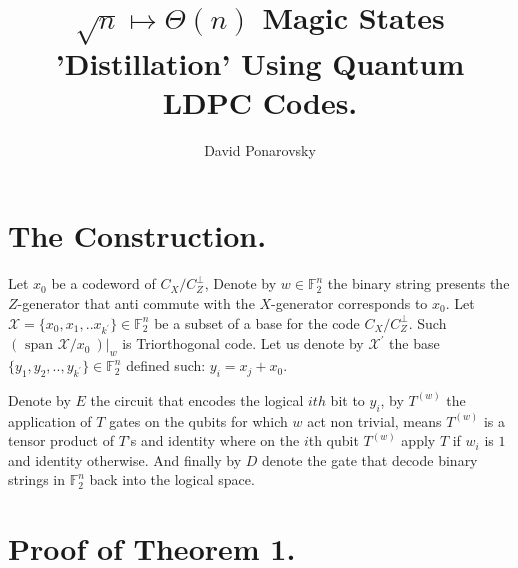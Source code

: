 \documentclass[manuscript,screen,review]{acmart}
\begin{document}

\title{ $\sqrt{n} \mapsto \Theta(n)$  Magic States 'Distillation' Using
Quantum LDPC Codes. }
\author{David Ponarovsky}
\maketitle

\newcommand*{\Mbas}{\mathcal{X}^\prime}
\newcommand*{\sMbas}{\text{span }\Mbas}
\newcommand*{\QQ}{C_{X}/C_{Z}^\perp }
\newcommand*{\trig}{Triorthogonal }
\newcommand*{\Hyp}{Hyperproduct }
\newcommand*{\Cin}{ C_{\text{initial}} }
\newcommand*{\Ctan}{ C_{\text{Tanner}} }
\section{The Construction.}

Let $x_{0}$ be a codeword of $\QQ$,  Denote by $w \in \mathbb{F}_{2}^{n}$
the binary string presents the $Z$-generator that anti commute with the
$X$-generator corresponds to $x_{0}$. Let $\mathcal{X} = \{x_{0}, x_{1}, .. x_{k^\prime}\} \in \mathbb{F}_{2}^{n}$ be a
subset of a base for the code $\QQ$. Such $\left(\text{ span } \mathcal{X}/x_0 \ \right)|_{w}$ is \trig code.  
Let us denote by $\Mbas$ the base $\{ y_{1}, y_{2}, .., y_{k^\prime} \} \in
\mathbb{F}_{2}^{n}$ defined such: $ y_{i} = x_{j} + x_{0}$. 

Denote by $E$ the circuit that encodes the logical $ith$ bit to $y_{i}$, by $T^{(w)}$ the application of
$T$ gates on the qubits for which $w$ act non trivial, means $T^{(w)}$ is a
tensor product of $T$'s and identity where on the $i$th qubit $T^{(w)}$ apply
$T$ if $w_{i}$ is $1$ and identity otherwise. And finally by $D$ denote the gate that decode binary strings in $\mathbb{F}_{2}^{n}$ back into the logical space.


\section{Proof of Theorem 1.}
\end{document}
